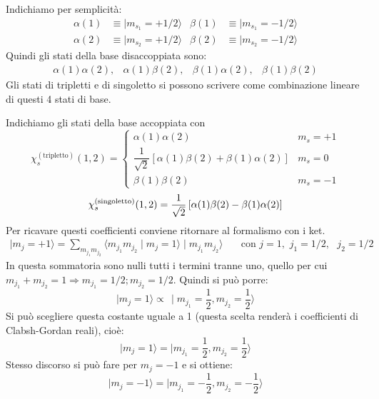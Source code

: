 Indichiamo per semplicità:
\begin{align}
\alpha (1) & \equiv \mid m_{s_{1}} = +1/2 \rangle & \beta (1) & \equiv \mid 
m_{s_{1}} = -1/2 \rangle \\
\alpha(2) & \equiv \mid m_{s_{2}} = +1/2 \rangle & \beta (2) & \equiv \mid 
m_{s_{2}} = -1/2 \rangle 
\end{align}
Quindi gli stati della base disaccoppiata sono: 
\begin{align}
\alpha (1) \alpha (2), & \alpha (1) \beta (2), & \beta (1) \alpha (2), & 
\beta(1) \beta (2) 
\end{align}
Gli stati di tripletti e di singoletto si possono scrivere come combinazione
lineare di questi 4 stati di base.

Indichiamo gli stati della base accoppiata con
\[
  \chi_{s}^{(\text{tripletto})} (1,2) = 
\begin{cases}
\alpha (1) \alpha(2) & m_{s} = +1 \\
\dfrac{1}{\sqrt{2}}\left[\alpha(1) \beta(2) + \beta(1)\alpha(2)\right] & m_{s}
=0 \\
\beta(1)\beta(2) & m_{s} = -1
\end{cases}
\]
\begin{equation}
  \chi_{s}^{\text{(\text{singoletto})}} (1,2) = \dfrac{1}{\sqrt{2}}\left[ 
\alpha(1)\beta(2) - \beta(1)\alpha(2)\right] 
\end{equation}
Per ricavare questi coefficienti conviene ritornare al formalismo con i ket.
\begin{align}
\mid m_{j} = +1 \rangle = \sum _{m_{j_{1}}m_{j_{2}}} \langle m_{j_{1}}m_{j_{2}}
\mid m_{j} = 1 \rangle \mid m_{j_{1}}m_{j_{2}}\rangle & \quad \text{con $j=1,$
  $j_{1}=1/2,$ $j_{2}=1/2$}
\end{align}
In  questa sommatoria sono nulli tutti i termini tranne uno, quello per cui
$m_{j_{1}} + m_{j_{2}} = 1 \Rightarrow m_{j_{1}} = 1/2; m_{j_{2}} = 1/2$. Quindi
si può porre:
\begin{equation}
\mid m_{j} =1 \rangle \propto\, \mid m_{j_{1}} = \dfrac{1}{2}, m_{j_{2}} =
\dfrac{1}{2} \rangle
\end{equation}
Si può scegliere questa costante uguale a 1 (questa scelta renderà i
coefficienti di Clabsh-Gordan reali), cioè:
\begin{equation}
\mid m_{j} = 1 \rangle = \mid m_{j_{1}} = \dfrac{1}{2}, m_{j_{2}} =\dfrac{1}{2} 
\rangle
\end{equation}
Stesso discorso si può fare per $m_{j} = -1$ e si ottiene:
\begin{equation}
\mid m_{j} = -1 \rangle = \mid m_{j_{1}} = -\dfrac{1}{2}, m_{j_{2}} 
=-\dfrac{1}{2} \rangle
\end{equation}
